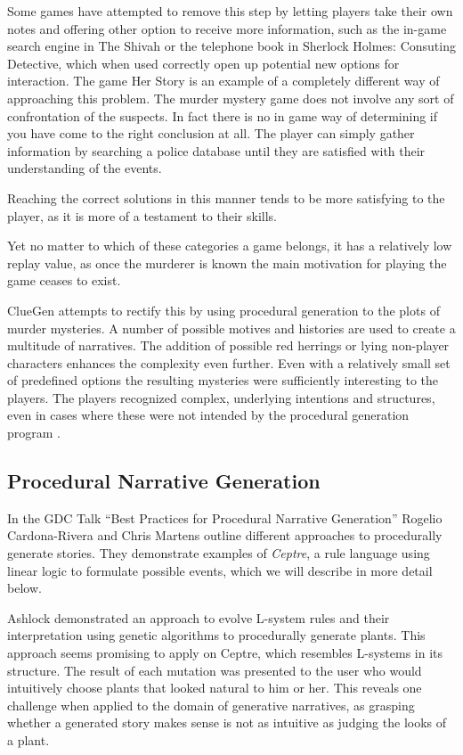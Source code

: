 Some games have attempted to remove this step by letting players take their own notes and offering other option to receive more information, such as the in-game search engine in The Shivah or the telephone book in Sherlock Holmes: Consuting Detective, which when used correctly open up potential new options for interaction.
The game Her Story is an example of a completely different way of approaching this problem.
The murder mystery game does not involve any sort of confrontation of the suspects.
In fact there is no in game way of determining if you have come to the right conclusion at all.
The player can simply gather information by searching a police database until they are satisfied with their understanding of the events.

Reaching the correct solutions in this manner tends to be more satisfying to the player, as it is more of a testament to their skills.

Yet no matter to which of these categories a game belongs, it has a relatively low replay value, as once the murderer is known the main motivation for playing the game ceases to exist.

ClueGen attempts to rectify this by using procedural generation to the plots of murder mysteries.
A number of possible motives and histories are used to create a multitude of narratives.
The addition of possible red herrings or lying non-player characters enhances the complexity even further.
Even with a relatively small set of predefined options the resulting mysteries were sufficiently interesting to the players.
The players recognized complex, underlying intentions and structures, even in cases where these were not intended by the procedural generation program \cite{AIIDE1614070}.

\subsection{Procedural Narrative Generation}

In the GDC Talk \enquote{Best Practices for Procedural Narrative Generation} Rogelio Cardona-Rivera and Chris Martens outline different approaches to procedurally generate stories.
They demonstrate examples of \emph{Ceptre}, a rule language using linear logic to formulate possible events, which we will describe in more detail below.

Ashlock demonstrated an approach to evolve L-system rules and their interpretation using genetic algorithms to procedurally generate plants.
This approach seems promising to apply on Ceptre, which resembles L-systems in its structure.
The result of each mutation was presented to the user who would intuitively choose plants that looked natural to him or her.
This reveals one challenge when applied to the domain of generative narratives, as grasping whether a generated story makes sense is not as intuitive as judging the looks of a plant.


